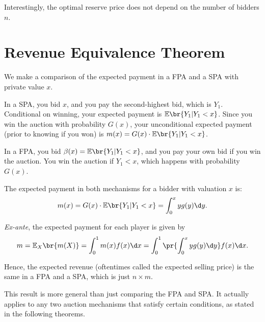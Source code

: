 Interestingly, the optimal reserve price does not depend on the number of bidders $n$.

\section{Revenue Equivalence Theorem}

We make a comparison of the expected payment in a FPA and a SPA with private value $x$.

In a SPA, you bid $x$, and you pay the second-highest bid, which is $Y_1$. Conditional on winning, your expected payment is $\mathbb E\br{Y_1|Y_1 < x}$. Since you win the auction with probability $G(x)$, your unconditional expected payment (prior to knowing if you won) is $m(x) = G(x)\cdot \mathbb E\br{Y_1|Y_1 < x}$.

In a FPA, you bid $\beta(x) = \mathbb E\br{Y_1|Y_1 < x}$, and you pay your own bid if you win the auction. You win the auction if $Y_1<x$, which happens with probability $G(x)$. 

The expected payment in both mechanisms for a bidder with valuation $x$ is:
\[
m(x) = G(x)\cdot \mathbb E\br{Y_1|Y_1 < x} = \int_0^x y g(y) \d y.
\]

\textit{Ex-ante}, the expected payment for each player is given by
\[
m = \mathbb E_{X}\br{m(X)} = \int_0^1 m(x) f(x) \d x = \int_0^1 \pr{\int_0^x y g(y) \d y} f(x) \d x.
\]

Hence, the expected revenue (oftentimes called the expected selling price) is the same in a FPA and a SPA, which is just $n\times m$.

This result is more general than just comparing the FPA and SPA. It actually applies to any two auction mechanisms that satisfy certain conditions, as stated in the following theorems.


